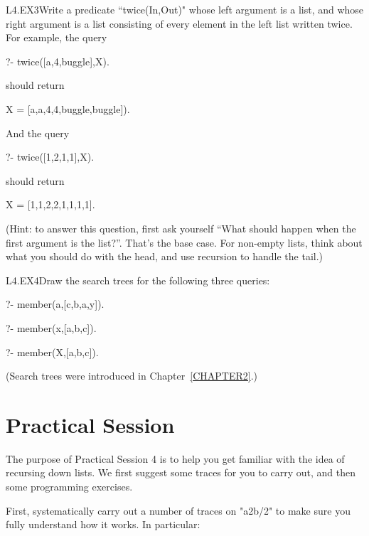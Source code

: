 \begin{LPNexercise}{L4.EX3}Write a predicate ``twice(In,Out)"
whose left argument is a list,
and whose right argument is a list consisting of every element in the
left list written twice.  For example, the query
\begin{LPNcodedisplay}
?- twice([a,4,buggle],X).
\end{LPNcodedisplay}
should return
\begin{LPNcodedisplay}
X = [a,a,4,4,buggle,buggle]).
\end{LPNcodedisplay}
And the query
\begin{LPNcodedisplay}
?- twice([1,2,1,1],X).
\end{LPNcodedisplay}
should return
\begin{LPNcodedisplay}
X = [1,1,2,2,1,1,1,1].
\end{LPNcodedisplay}

(Hint: to answer this question, first ask yourself ``What should happen
when the first argument is the  list?''.  That's the base case.
For non-empty lists, think about what you should do with the head, and
use recursion to handle the tail.)
\end{LPNexercise}


\begin{LPNexercise}{L4.EX4}Draw the search trees for the following three queries:

\begin{LPNcodedisplay}
?- member(a,[c,b,a,y]).

?- member(x,[a,b,c]).

?- member(X,[a,b,c]).

\end{LPNcodedisplay}
(Search trees were introduced in Chapter~\ref{CHAPTER2}.)
\end{LPNexercise}


\section{Practical Session}\label{SEC.L4.PRAXIS}



The purpose of Practical Session 4 is to help you get familiar with
the idea of recursing down lists.  We first suggest some traces for
you to carry out, and then some programming exercises.

First, systematically carry out a number of traces on
"a2b/2" to make sure you fully understand how it
works. In particular:


